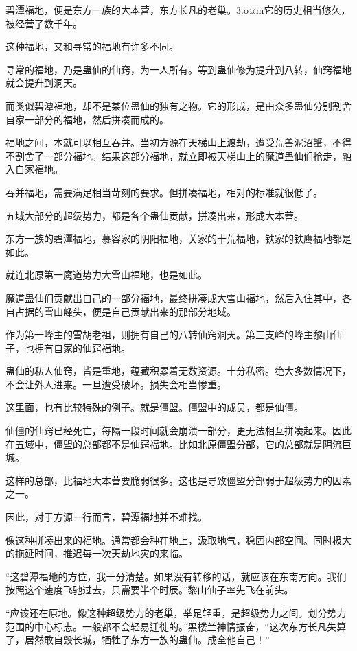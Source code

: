 
\begin{this_body}

碧潭福地，便是东方一族的大本营，东方长凡的老巢。3.o¤m它的历史相当悠久，被经营了数千年。

这种福地，又和寻常的福地有许多不同。

寻常的福地，乃是蛊仙的仙窍，为一人所有。等到蛊仙修为提升到八转，仙窍福地就会提升到洞天。

而类似碧潭福地，却不是某位蛊仙的独有之物。它的形成，是由众多蛊仙分别割舍自家一部分的福地，然后拼凑而成的。

福地之间，本就可以相互吞并。当初方源在天梯山上渡劫，遭受荒兽泥沼蟹，不得不割舍了一部分福地。结果这部分福地，就立即被天梯山上的魔道蛊仙们抢走，融入自家福地。

吞并福地，需要满足相当苛刻的要求。但拼凑福地，相对的标准就很低了。

五域大部分的超级势力，都是各个蛊仙贡献，拼凑出来，形成大本营。

东方一族的碧潭福地，慕容家的阴阳福地，关家的十荒福地，铁家的铁鹰福地都是如此。

就连北原第一魔道势力大雪山福地，也是如此。

魔道蛊仙们贡献出自己的一部分福地，最终拼凑成大雪山福地，然后入住其中，各自占据的雪山峰头，便是自己贡献出来的那部分地域。

作为第一峰主的雪胡老祖，则拥有自己的八转仙窍洞天。第三支峰的峰主黎山仙子，也拥有自家的仙窍福地。

蛊仙的私人仙窍，皆是重地，蕴藏积累着无数资源。十分私密。绝大多数情况下，不会让外人进来。一旦遭受破坏。损失会相当惨重。

这里面，也有比较特殊的例子。就是僵盟。僵盟中的成员，都是仙僵。

仙僵的仙窍已经死亡，每隔一段时间就会崩溃一部分，更无法相互拼凑起来。因此在五域中，僵盟的总部都不是仙窍福地。比如北原僵盟分部，它的总部就是阴流巨城。

这样的总部，比福地大本营要脆弱很多。这也是导致僵盟分部弱于超级势力的因素之一。

因此，对于方源一行而言，碧潭福地并不难找。

像这种拼凑出来的福地。通常都会种在地上，汲取地气，稳固内部空间。同时极大的拖延时间，推迟每一次天劫地灾的来临。

“这碧潭福地的方位，我十分清楚。如果没有转移的话，就应该在东南方向。我们按照这个速度飞驰过去，只需要半个时辰。”黎山仙子率先飞在前头。

“应该还在原地。像这种超级势力的老巢，举足轻重，是超级势力之间。划分势力范围的中心标志。一般都不会轻易迁徙的。”黑楼兰神情振奋，“这次东方长凡失算了，居然敢自毁长城，牺牲了东方一族的蛊仙。成全他自己！”


\end{this_body}
